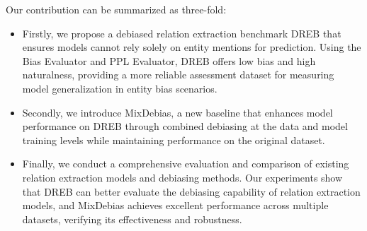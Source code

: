 \documentclass[letterpaper]{article} %
\begin{document}
Our contribution can be summarized as three-fold:
\begin{itemize}
    \item Firstly, we propose a debiased relation extraction benchmark DREB that ensures models cannot rely solely on entity mentions for prediction. Using the Bias Evaluator and PPL Evaluator, DREB offers low bias and high naturalness, providing a more reliable assessment dataset for measuring model generalization in entity bias scenarios.
    \item Secondly, we introduce MixDebias, a new baseline that enhances model performance on DREB through combined debiasing at the data and model training levels while maintaining performance on the original dataset.
    \item Finally, we conduct a comprehensive evaluation and comparison of existing relation extraction models and debiasing methods. Our experiments show that DREB can better evaluate the debiasing capability of relation extraction models, and MixDebias achieves excellent performance across multiple datasets, verifying its effectiveness and robustness.
\end{itemize}
\end{document}
